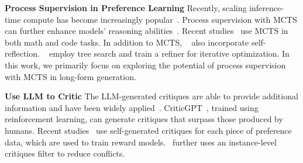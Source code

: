 \textbf{Process Supervision in Preference Learning} %
Recently, scaling inference-time compute has become increasingly popular~\citep{chen2024optimaoptimizingeffectivenessefficiency,setlur2024rewardingprogressscalingautomated,snell2024scalingllmtesttimecompute}. Process supervision with MCTS can further enhance models' reasoning abilities~\citep{tian2024selfimprovementllmsimaginationsearching,zhang2024chainpreferenceoptimizationimproving,zhang2024accessinggpt4levelmathematical}. Recent studies~\citep{wang2024selfimprovementllmsmctsleveraging,xu2024sramctsselfdrivenreasoningaugmentation} use MCTS in both math and code tasks. In addition to MCTS, ~\citet{zhao2024marcoo1openreasoningmodels} also incorporate self-reflection. ~\citet{cheng2024sparselfplaytreesearchrefinement} employ tree search and train a refiner for iterative optimization. In this work, we primarily focus on exploring the potential of process supervision with MCTS in long-form generation.

\textbf{Use LLM to Critic} The LLM-generated critiques are able to provide additional information and have been widely applied~\citep{madaan2023selfrefineiterativerefinementselffeedback,yuan-etal-2024-llmcrit}. CriticGPT~\citep{mcaleese2024llm}, trained using reinforcement learning, can generate critiques that surpass those produced by humans. Recent studies~\citep{ankner2024critiqueoutloudrewardmodels, ye2024improvingrewardmodelssynthetic} use self-generated critiques for each piece of preference data, which are used to train reward models.~\citet{yu2024selfgeneratedcritiquesboostreward} further uses an instance-level critiques filter to reduce conflicts.